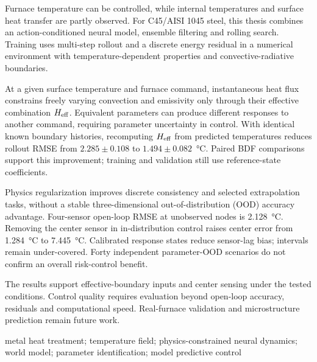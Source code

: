 \begin{abstract*}

Furnace temperature can be controlled, while internal temperatures and surface heat transfer are partly observed. For C45/AISI 1045 steel, this thesis combines an action-conditioned neural model, ensemble filtering and rolling search. Training uses multi-step rollout and a discrete energy residual in a numerical environment with temperature-dependent properties and convective-radiative boundaries.

At a given surface temperature and furnace command, instantaneous heat flux constrains freely varying convection and emissivity only through their effective combination ${H_{\mathrm{eff}}}$. Equivalent parameters can produce different responses to another command, requiring parameter uncertainty in control. With identical known boundary histories, recomputing ${H_{\mathrm{eff}}}$ from predicted temperatures reduces rollout RMSE from $2.285\pm0.108$ to $1.494\pm0.082$~\si{\degreeCelsius}. Paired BDF comparisons support this improvement; training and validation still use reference-state coefficients.

Physics regularization improves discrete consistency and selected extrapolation tasks, without a stable three-dimensional out-of-distribution (OOD) accuracy advantage. Four-sensor open-loop RMSE at unobserved nodes is \SI{2.128}{\degreeCelsius}. Removing the center sensor in in-distribution control raises center error from \SI{1.284}{\degreeCelsius} to \SI{7.445}{\degreeCelsius}. Calibrated response states reduce sensor-lag bias; intervals remain under-covered. Forty independent parameter-OOD scenarios do not confirm an overall risk-control benefit.

The results support effective-boundary inputs and center sensing under the tested conditions. Control quality requires evaluation beyond open-loop accuracy, residuals and computational speed. Real-furnace validation and microstructure prediction remain future work.

\par{}metal heat treatment; temperature field; physics-constrained neural dynamics; world model; parameter identification; model predictive control
\end{abstract*}
